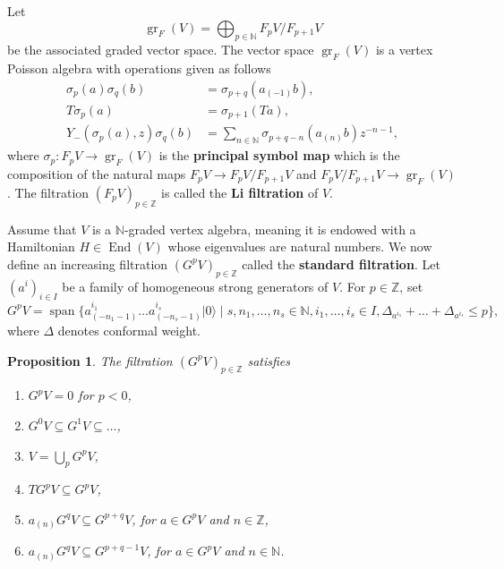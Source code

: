 \documentclass[12pt, reqno]{amsart}
\newtheorem{proposition}[theorem]{Proposition}
\theoremstyle{remark}
\DeclareMathOperator{\gr}{gr}
\DeclareMathOperator{\End}{End}
\DeclareMathOperator{\vspan}{span}
\newcommand{\vac}{|0\rangle}
\begin{document}
Let
\begin{equation*}
  \gr_F(V) = \bigoplus_{p \in \mathbb{N}}F_pV/F_{p + 1}V
\end{equation*}
be the associated graded vector space.
The vector space $\gr_F(V)$ is a vertex Poisson algebra with operations given as follows
\begin{align*}
  \sigma_p(a)\sigma_q(b) &= \sigma_{p + q}(a_{(-1)}b), \\
  T\sigma_p(a) &= \sigma_{p + 1}(Ta), \\
  Y_-(\sigma_p(a),z)\sigma_q(b) &= \sum_{n \in \mathbb{N}}\sigma_{p + q - n}(a_{(n)}b)z^{-n - 1},
\end{align*}
where $\sigma_p: F_pV \to \gr_F(V)$ is the \textbf{principal symbol map} which is the composition of the natural maps $F_pV \to F_pV/F_{p + 1}V$ and $F_pV/F_{p+1}V \to \gr_F(V)$.
The filtration $(F_pV)_{p \in \mathbb{Z}}$ is called the \textbf{Li filtration} of $V$.

Assume that $V$ is a $\mathbb{N}$-graded vertex algebra, meaning it is endowed with a Hamiltonian $H \in \End(V)$ whose eigenvalues are natural numbers.
We now define an increasing filtration $(G^pV)_{p \in \mathbb{Z}}$ called the \textbf{standard filtration}.
Let $(a^i)_{i \in I}$ be a family of homogeneous strong generators of $V$.
For $p \in \mathbb{Z}$, set
\begin{equation*}
  G^pV = \vspan\{a^{i_1}_{(-n_1 - 1)}\dots a^{i_s}_{(-n_s - 1)}\vac \mid s, n_1, \dots, n_s \in \mathbb{N}, i_1, \dots, i_s \in I, \Delta_{a^{i_1}} + \dots + \Delta_{a^{i_s}} \le p\},
\end{equation*}
where $\Delta$ denotes conformal weight.

\begin{proposition}
  \label{prp:2}
  The filtration $(G^pV)_{p \in \mathbb{Z}}$ satisfies
  \begin{enumerate}[label={(\alph*)}]
  \item $G^pV = 0$ for $p < 0$,
  \item $G^0V \subseteq G^1V \subseteq \dots$,
  \item $V = \bigcup_pG^pV$,
  \item $TG^pV \subseteq G^pV$,
  \item $a_{(n)}G^qV \subseteq G^{p + q}V$, for $a \in G^pV$ and $n \in \mathbb{Z}$,
  \item $a_{(n)}G^qV \subseteq G^{p + q - 1}V$, for $a \in G^pV$ and $n \in \mathbb{N}$.
  \end{enumerate}
\end{proposition}
\end{document}
